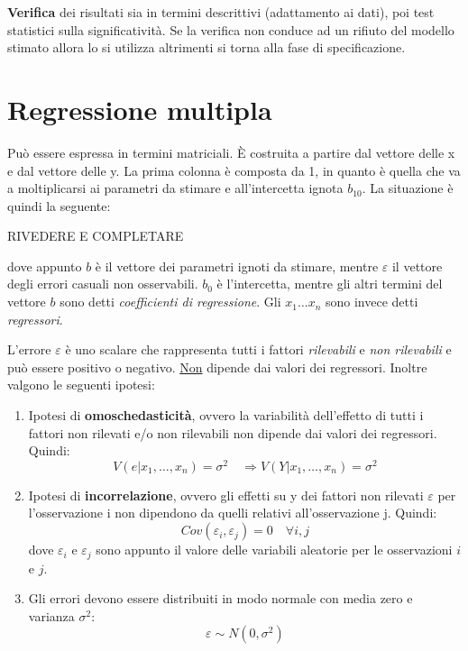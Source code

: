 \documentclass[]{article}
\begin{document}
\textbf{Verifica} dei risultati sia in termini descrittivi (adattamento
ai dati), poi test statistici sulla significatività. Se la verifica non
conduce ad un rifiuto del modello stimato allora lo si utilizza
altrimenti si torna alla fase di specificazione.

\section{Regressione multipla}\label{regressione-multipla}

Può essere espressa in termini matriciali. È costruita a partire dal
vettore delle x e dal vettore delle y. La prima colonna è composta da 1, in quanto è quella che va a moltiplicarsi ai parametri da stimare e all'intercetta ignota $b_{10}$. La situazione è quindi la seguente:

RIVEDERE E COMPLETARE

dove appunto $b$ è il vettore dei parametri ignoti da stimare, mentre $\varepsilon$ il vettore degli errori casuali non osservabili. $b_0$ è l'intercetta, mentre gli altri termini del vettore $b$ sono  detti \textit{coefficienti di regressione}.  Gli $x_1 \dots x_n$ sono invece detti \textit{regressori}.

L'errore $\varepsilon$ è uno scalare che rappresenta tutti i fattori \textit{rilevabili} e \textit{non rilevabili} e può essere positivo o negativo. \underline{Non} dipende dai valori dei regressori. Inoltre valgono le seguenti ipotesi:
\begin{enumerate}
\item Ipotesi di \textbf{omoschedasticità}, ovvero la  variabilità  dell'effetto  di  tutti  i  fattori  non  rilevati  e/o  non  rilevabili  non  dipende  dai 
valori dei regressori. Quindi:
\begin{equation}
V(e \vert x_1, \dots, x_n) = \sigma^2 \quad \Rightarrow V(Y \vert x_1, \dots, x_n) = \sigma^2
\end{equation}
\item Ipotesi di \textbf{incorrelazione}, ovvero gli  effetti su y dei  fattori  non  rilevati $\varepsilon$  per  l'osservazione i non  dipendono  da  quelli relativi all'osservazione j. Quindi:
\begin{equation}
Cov(\varepsilon_i, \varepsilon_j) = 0 \quad \forall i, j
\end{equation}
dove $\varepsilon_i$ e $\varepsilon_j$ sono appunto il valore delle variabili aleatorie per le osservazioni $i$ e $j$.
\item Gli errori devono essere distribuiti in modo normale con media zero e varianza $\sigma^2$:
\begin{equation}
\varepsilon \sim N(0,\sigma^2)
\end{equation}
\end{enumerate}
\end{document}

